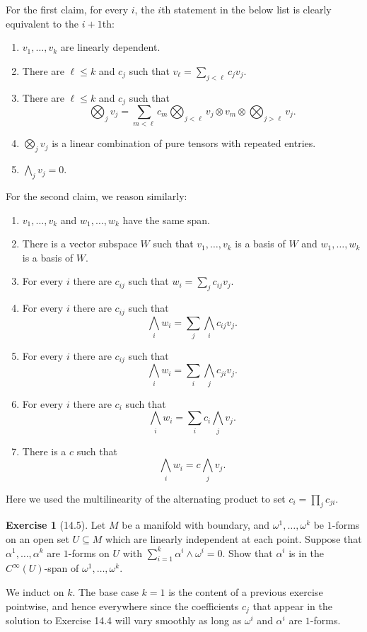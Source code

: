 \documentclass[10pt]{article}
\theoremstyle{definition}
\newtheorem{exer}{Exercise}
\begin{document}
For the first claim, for every $i$, the $i$th statement in the below list is clearly equivalent to the $i+1$th:
\begin{enumerate}
\item $v_1, \dots, v_k$ are linearly dependent.
\item There are $\ell \leq k$ and $c_j$ such that $v_\ell = \sum_{j<\ell} c_j v_j$.
\item There are $\ell \leq k$ and $c_j$ such that
$$\bigotimes_j v_j = \sum_{m<\ell} c_m \bigotimes_{j<\ell} v_j \otimes v_m \otimes \bigotimes_{j>\ell} v_j.$$
\item $\bigotimes_j v_j$ is a linear combination of pure tensors with repeated entries.
\item $\bigwedge_j v_j = 0$.
\end{enumerate}
For the second claim, we reason similarly:
\begin{enumerate}
\item $v_1, \dots, v_k$ and $w_1, \dots, w_k$ have the same span.
\item There is a vector subspace $W$ such that $v_1, \dots, v_k$ is a basis of $W$ and $w_1, \dots, w_k$ is a basis of $W$.
\item For every $i$ there are $c_{ij}$ such that $w_i = \sum_j c_{ij} v_j$.
\item For every $i$ there are $c_{ij}$ such that
$$\bigwedge_i w_i = \sum_j \bigwedge_i c_{ij} v_j.$$
\item For every $i$ there are $c_{ij}$ such that
$$\bigwedge_i w_i = \sum_i \bigwedge_j c_{ji} v_j.$$
\item For every $i$ there are $c_i$ such that
$$\bigwedge_i w_i = \sum_i c_i \bigwedge_j v_j.$$
\item There is a $c$ such that
$$\bigwedge_i w_i = c\bigwedge_j v_j.$$
\end{enumerate}
Here we used the multilinearity of the alternating product to set $c_i = \prod_j c_{ji}$.

\begin{exer}[14.5]
Let $M$ be a manifold with boundary, and $\omega^1, \dots, \omega^k$ be $1$-forms on an open set $U \subseteq M$ which are linearly independent at each point.
Suppose that $\alpha^1, \dots, \alpha^k$ are $1$-forms on $U$ with $\sum_{i=1}^k \alpha^i \wedge \omega^i = 0$.
Show that $\alpha^i$ is in the $C^\infty(U)$-span of $\omega^1, \dots, \omega^k$.
\end{exer}

We induct on $k$. The base case $k = 1$ is the content of a previous exercise pointwise, and hence everywhere since the coefficients $c_j$ that appear in the solution to Exercise 14.4 will vary smoothly as long as $\omega^i$ and $\alpha^i$ are $1$-forms.
\end{document}
